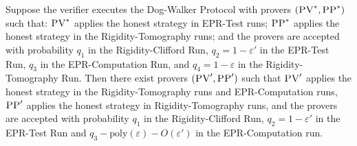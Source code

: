 \documentclass{toc}
\newcommand{\eps}{\varepsilon}
\newcommand{\pv}{\textsc{PV}}
\newcommand{\pp}{\textsc{PP}}
\begin{document}
\begin{lemma}\label{lem:PV-34}
Suppose the verifier executes the Dog-Walker Protocol with provers $(\pv^*,\pp^*)$ such that: $\pv^*$ applies the honest strategy in EPR-Test runs; 
$\pp^*$ applies the honest strategy in the Rigidity-Tomography runs; and the provers are accepted with probability $q_1$ in the Rigidity-Clifford Run, $q_2 = 1-\eps'$ in the EPR-Test Run, $q_3$ in the EPR-Computation Run, and $q_4=1-\eps$ in the Rigidity-Tomography Run. Then there exist provers $(\pv',\pp')$ such that $\pv'$ applies the honest strategy in the Rigidity-Tomography runs and EPR-Computation runs, $\pp'$ applies the honest strategy in Rigidity-Tomography runs, and
the provers are accepted with probability $q_1$ in the Rigidity-Clifford Run, $q_2 = 1-\eps'$ in the EPR-Test Run and $q_3-\mathrm{poly}(\eps)-O(\eps')$ in the EPR-Computation run. 
\end{lemma}
\end{document}
